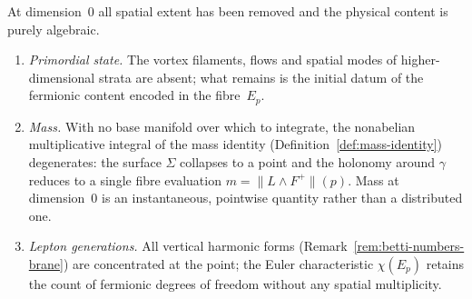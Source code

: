 \begin{remark}
\label{rem:descent-physical-zero}
At dimension~$0$ all spatial extent has been removed and the physical
content is purely algebraic.
\begin{enumerate}
  \item \emph{Primordial state.}  The vortex filaments, flows and spatial
        modes of higher-dimensional strata are absent; what remains is
        the initial datum of the fermionic content encoded in the
        fibre~$E_p$.
  \item \emph{Mass.}  With no base manifold over which to integrate, the
        nonabelian multiplicative integral of the mass identity
        (Definition~\ref{def:mass-identity}) degenerates: the surface
        $\Sigma$ collapses to a point and the holonomy around $\gamma$
        reduces to a single fibre evaluation
        $m = \lVert L \wedge F^+\rVert(p)$.
        Mass at dimension~$0$ is an instantaneous, pointwise quantity
        rather than a distributed one.
  \item \emph{Lepton generations.}  All vertical harmonic forms
        (Remark~\ref{rem:betti-numbers-brane}) are concentrated at the
        point; the Euler characteristic $\chi(E_p)$ retains the count of
        fermionic degrees of freedom without any spatial multiplicity.
\end{enumerate}
\end{remark}

